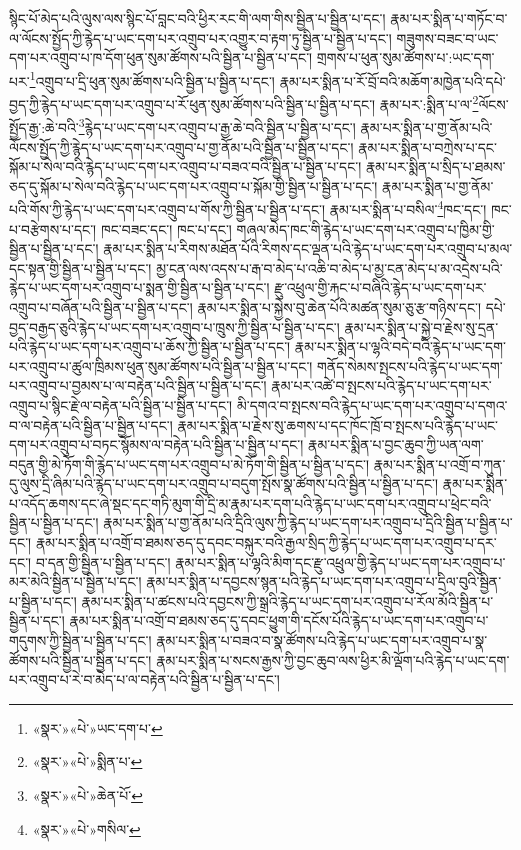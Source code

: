 སྙིང་པོ་མེད་པའི་ལུས་ལས་སྙིང་པོ་བླང་བའི་ཕྱིར་རང་གི་ལག་གིས་སྦྱིན་པ་སྦྱིན་པ་དང་། རྣམ་པར་སྨིན་པ་གཏོང་བ་ལ་ལོངས་སྤྱོད་ཀྱི་རྙེད་པ་ཡང་དག་པར་འགྲུབ་པར་འགྱུར་བ་རྟག་ཏུ་སྦྱིན་པ་སྦྱིན་པ་དང་། གཟུགས་བཟང་བ་ཡང་དག་པར་འགྲུབ་པ་ཁ་དོག་ཕུན་སུམ་ཚོགས་པའི་སྦྱིན་པ་སྦྱིན་པ་དང་། གྲགས་པ་ཕུན་སུམ་ཚོགས་པ་:ཡང་དག་པར་\footnote{«སྣར་»«པེ་»ཡང་དག་པ་}འགྲུབ་པ་དྲི་ཕུན་སུམ་ཚོགས་པའི་སྦྱིན་པ་སྦྱིན་པ་དང་། རྣམ་པར་སྨིན་པ་རོ་བྲོ་བའི་མཆོག་མཁྱེན་པའི་དཔེ་བྱད་ཀྱི་རྙེད་པ་ཡང་དག་པར་འགྲུབ་པ་རོ་ཕུན་སུམ་ཚོགས་པའི་སྦྱིན་པ་སྦྱིན་པ་དང་། རྣམ་པར་:སྨིན་པ་ལ་\footnote{«སྣར་»«པེ་»སྨིན་པ་}ལོངས་སྤྱོད་རྒྱ་:ཆེ་བའི་\footnote{«སྣར་»«པེ་»ཆེན་པོ་}རྙེད་པ་ཡང་དག་པར་འགྲུབ་པ་རྒྱ་ཆེ་བའི་སྦྱིན་པ་སྦྱིན་པ་དང་། རྣམ་པར་སྨིན་པ་གྱ་ནོམ་པའི་ལོངས་སྤྱོད་ཀྱི་རྙེད་པ་ཡང་དག་པར་འགྲུབ་པ་གྱ་ནོམ་པའི་སྦྱིན་པ་སྦྱིན་པ་དང་། རྣམ་པར་སྨིན་པ་བཀྲེས་པ་དང་སྐོམ་པ་སེལ་བའི་རྙེད་པ་ཡང་དག་པར་འགྲུབ་པ་བཟའ་བའི་སྦྱིན་པ་སྦྱིན་པ་དང་། རྣམ་པར་སྨིན་པ་སྲིད་པ་ཐམས་ཅད་དུ་སྐོམ་པ་སེལ་བའི་རྙེད་པ་ཡང་དག་པར་འགྲུབ་པ་སྐོམ་གྱི་སྦྱིན་པ་སྦྱིན་པ་དང་། རྣམ་པར་སྨིན་པ་གྱ་ནོམ་པའི་གོས་ཀྱི་རྙེད་པ་ཡང་དག་པར་འགྲུབ་པ་གོས་ཀྱི་སྦྱིན་པ་སྦྱིན་པ་དང་། རྣམ་པར་སྨིན་པ་བསིལ་\footnote{«སྣར་»«པེ་»གསིལ་}ཁང་དང་། ཁང་པ་བརྩེགས་པ་དང་། ཁང་བཟང་དང་། ཁང་པ་དང་། གཞལ་མེད་ཁང་གི་རྙེད་པ་ཡང་དག་པར་འགྲུབ་པ་ཁྱིམ་གྱི་སྦྱིན་པ་སྦྱིན་པ་དང་། རྣམ་པར་སྨིན་པ་རིགས་མཐོན་པོའི་རིགས་དང་ལྡན་པའི་རྙེད་པ་ཡང་དག་པར་འགྲུབ་པ་མལ་དང་སྟན་གྱི་སྦྱིན་པ་སྦྱིན་པ་དང་། མྱ་ངན་ལས་འདས་པ་རྒ་བ་མེད་པ་འཆི་བ་མེད་པ་མྱ་ངན་མེད་པ་མ་འདྲེས་པའི་རྙེད་པ་ཡང་དག་པར་འགྲུབ་པ་སྨན་གྱི་སྦྱིན་པ་སྦྱིན་པ་དང་། རྫུ་འཕྲུལ་གྱི་རྐང་པ་བཞིའི་རྙེད་པ་ཡང་དག་པར་འགྲུབ་པ་བཞོན་པའི་སྦྱིན་པ་སྦྱིན་པ་དང་། རྣམ་པར་སྨིན་པ་སྐྱེས་བུ་ཆེན་པོའི་མཚན་སུམ་ཅུ་རྩ་གཉིས་དང་། དཔེ་བྱད་བརྒྱད་ཅུའི་རྙེད་པ་ཡང་དག་པར་འགྲུབ་པ་ཁྲུས་ཀྱི་སྦྱིན་པ་སྦྱིན་པ་དང་། རྣམ་པར་སྨིན་པ་སྐྱེ་བ་རྗེས་སུ་དྲན་པའི་རྙེད་པ་ཡང་དག་པར་འགྲུབ་པ་ཆོས་ཀྱི་སྦྱིན་པ་སྦྱིན་པ་དང་། རྣམ་པར་སྨིན་པ་ལྷའི་བདེ་བའི་རྙེད་པ་ཡང་དག་པར་འགྲུབ་པ་ཚུལ་ཁྲིམས་ཕུན་སུམ་ཚོགས་པའི་སྦྱིན་པ་སྦྱིན་པ་དང་། གནོད་སེམས་སྤངས་པའི་རྙེད་པ་ཡང་དག་པར་འགྲུབ་པ་བྱམས་པ་ལ་བརྟེན་པའི་སྦྱིན་པ་སྦྱིན་པ་དང་། རྣམ་པར་འཚེ་བ་སྤངས་པའི་རྙེད་པ་ཡང་དག་པར་འགྲུབ་པ་སྙིང་རྗེ་ལ་བརྟེན་པའི་སྦྱིན་པ་སྦྱིན་པ་དང་། མི་དགའ་བ་སྤངས་བའི་རྙེད་པ་ཡང་དག་པར་འགྲུབ་པ་དགའ་བ་ལ་བརྟེན་པའི་སྦྱིན་པ་སྦྱིན་པ་དང་། རྣམ་པར་སྨིན་པ་རྗེས་སུ་ཆགས་པ་དང་ཁོང་ཁྲོ་བ་སྤངས་པའི་རྙེད་པ་ཡང་དག་པར་འགྲུབ་པ་བཏང་སྙོམས་ལ་བརྟེན་པའི་སྦྱིན་པ་སྦྱིན་པ་དང་། རྣམ་པར་སྨིན་པ་བྱང་ཆུབ་ཀྱི་ཡན་ལག་བདུན་གྱི་མེ་ཏོག་གི་རྙེད་པ་ཡང་དག་པར་འགྲུབ་པ་མེ་ཏོག་གི་སྦྱིན་པ་སྦྱིན་པ་དང་། རྣམ་པར་སྨིན་པ་འགྲོ་བ་ཀུན་དུ་ལུས་དྲི་ཞིམ་པའི་རྙེད་པ་ཡང་དག་པར་འགྲུབ་པ་བདུག་སྤོས་སྣ་ཚོགས་པའི་སྦྱིན་པ་སྦྱིན་པ་དང་། རྣམ་པར་སྨིན་པ་འདོད་ཆགས་དང་ཞེ་སྡང་དང་གཏི་མུག་གི་དྲི་མ་རྣམ་པར་དག་པའི་རྙེད་པ་ཡང་དག་པར་འགྲུབ་པ་ཕྲེང་བའི་སྦྱིན་པ་སྦྱིན་པ་དང་། རྣམ་པར་སྨིན་པ་གྱ་ནོམ་པའི་དྲིའི་ལུས་ཀྱི་རྙེད་པ་ཡང་དག་པར་འགྲུབ་པ་དྲིའི་སྦྱིན་པ་སྦྱིན་པ་དང་། རྣམ་པར་སྨིན་པ་འགྲོ་བ་ཐམས་ཅད་དུ་དབང་བསྐུར་བའི་རྒྱལ་སྲིད་ཀྱི་རྙེད་པ་ཡང་དག་པར་འགྲུབ་པ་དར་དང་། བ་དན་གྱི་སྦྱིན་པ་སྦྱིན་པ་དང་། རྣམ་པར་སྨིན་པ་ལྷའི་མིག་དང་རྫུ་འཕྲུལ་གྱི་རྙེད་པ་ཡང་དག་པར་འགྲུབ་པ་མར་མེའི་སྦྱིན་པ་སྦྱིན་པ་དང་། རྣམ་པར་སྨིན་པ་དབྱངས་སྙན་པའི་རྙེད་པ་ཡང་དག་པར་འགྲུབ་པ་དྲིལ་བུའི་སྦྱིན་པ་སྦྱིན་པ་དང་། རྣམ་པར་སྨིན་པ་ཚངས་པའི་དབྱངས་ཀྱི་སྒྲའི་རྙེད་པ་ཡང་དག་པར་འགྲུབ་པ་རོལ་མོའི་སྦྱིན་པ་སྦྱིན་པ་དང་། རྣམ་པར་སྨིན་པ་འགྲོ་བ་ཐམས་ཅད་དུ་དབང་ཕྱུག་གི་དངོས་པོའི་རྙེད་པ་ཡང་དག་པར་འགྲུབ་པ་གདུགས་ཀྱི་སྦྱིན་པ་སྦྱིན་པ་དང་། རྣམ་པར་སྨིན་པ་བཟའ་བ་སྣ་ཚོགས་པའི་རྙེད་པ་ཡང་དག་པར་འགྲུབ་པ་སྣ་ཚོགས་པའི་སྦྱིན་པ་སྦྱིན་པ་དང་། རྣམ་པར་སྨིན་པ་སངས་རྒྱས་ཀྱི་བྱང་ཆུབ་ལས་ཕྱིར་མི་ལྡོག་པའི་རྙེད་པ་ཡང་དག་པར་འགྲུབ་པ་རེ་བ་མེད་པ་ལ་བརྟེན་པའི་སྦྱིན་པ་སྦྱིན་པ་དང་། 